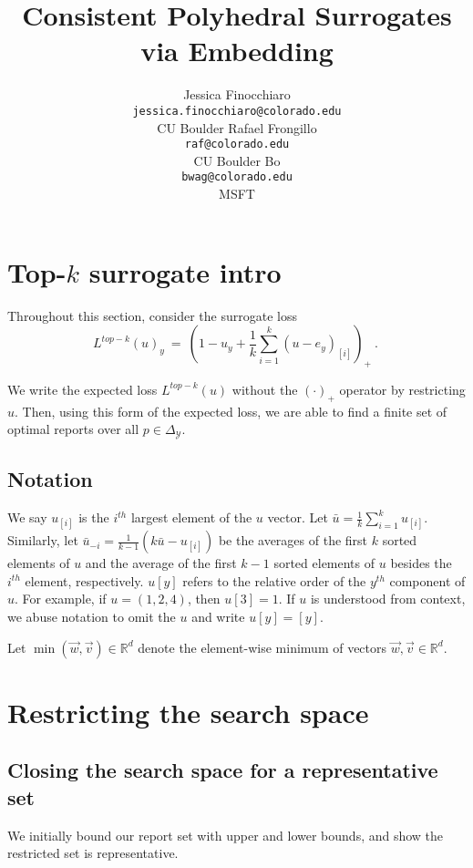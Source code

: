 \documentclass[12pt]{article}
\title{Consistent Polyhedral Surrogates via Embedding}
\author{%
 Jessica Finocchiaro\raf{Jessie?} \\
 \texttt{jessica.finocchiaro@colorado.edu}\\
 CU Boulder
 \And
 Rafael Frongillo\\
 \texttt{raf@colorado.edu}\\
 CU Boulder
 \And
 Bo\\
 \texttt{bwag@colorado.edu}\\
 MSFT
}
\newcommand{\reals}{\mathbb{R}}
\newcommand{\simplex}{\Delta_\Y}
\newcommand{\Y}{\mathcal{Y}}
\begin{document}
\section{Top-$k$ surrogate intro}

Throughout this section, consider the surrogate loss \begin{equation}\label{eq:top-k-surrogate}
L^{top-k}(u)_y~=~\left(1 - u_y + \frac{1}{k} \sum_{i=1}^k (u - e_y)_{[i]} \right)_+~.~
\end{equation}

We write the expected loss $L^{top-k}(u)$ without the $(\cdot)_+$ operator by restricting $u$.
Then, using this form of the expected loss, we are able to find a finite set of optimal reports over all $p \in \simplex$.

\subsection{Notation}
We say $u_{[i]}$ is the $i^{th}$ largest element of the $u$ vector.
Let $\bar{u} = \frac 1 k \sum_{i = 1}^k u_{[i]}$.
Similarly, let $\bar{u}_{-i} = \frac{1}{k-1} (k \bar u - u_{[i]})$ be the averages of the first $k$ sorted elements of $u$ and the average of the first $k-1$ sorted elements of $u$ besides the $i^{th}$ element, respectively.
$u[y]$ refers to the relative order of the $y^{th}$ component of $u$.
For example, if $u = (1,2,4)$, then $u[3] = 1$. 
If $u$ is understood from context, we abuse notation to omit the $u$ and write $u[y] = [y]$.

Let $\min(\vec w, \vec v) \in \reals^d$ denote the element-wise minimum of vectors $\vec w, \vec v \in \reals^d$.



\section{Restricting the search space}
\subsection{Closing the search space for a representative set}\label{sec:assumptions}
We initially bound our report set with upper and lower bounds, and show the restricted set is representative. 
\end{document}
